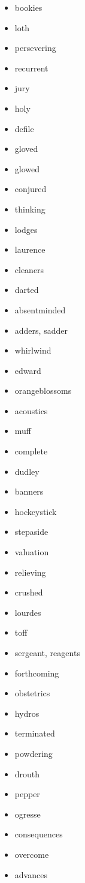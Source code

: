 \documentclass{article}
\begin{document}
\begin{itemize}
    \item bookies
    \item loth
    \item persevering
    \item recurrent
    \item jury
    \item holy
    \item defile
    \item gloved
    \item glowed
    \item conjured
    \item thinking
    \item lodges
    \item laurence
    \item cleaners
    \item darted
    \item absentminded
    \item adders, sadder
    \item whirlwind
    \item edward
    \item orangeblossoms
    \item acoustics
    \item muff
    \item complete
    \item dudley
    \item banners
    \item hockeystick
    \item stepaside
    \item valuation
    \item relieving
    \item crushed
    \item lourdes
    \item toff
    \item sergeant, reagents
    \item forthcoming
    \item obstetrics
    \item hydros
    \item terminated
    \item powdering
    \item drouth
    \item pepper
    \item ogresse
    \item consequences
    \item overcome
    \item advances

\end{itemize}
\end{document}
